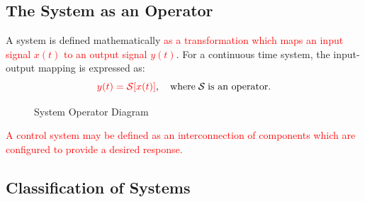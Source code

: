 \documentclass[
  12pt,
  a4paper,
]{report}
\begin{document}
\subsection{The System as an Operator}\label{the-system-as-an-operator}

\begin{tcolorbox}[colback=boxbodycol,colframe=boxheadcol,title=\textcolor{red}{\textbf{The System Operator}}]    
    A system is defined mathematically \textcolor{red}{as a transformation which maps an input signal \(x(t)\) to an output signal \(y(t)\)}. For a continuous time system, the input-output mapping is expressed as:
    \begin{equation}
        \label{eq:system-operator-def-equation}
        \textcolor{red}{y(t) = \mathcal{S}[x(t)]}, \quad \text{where} \; \mathcal{S} \; \text{is an operator.}
    \end{equation}
    \begin{tcolorbox}[colback=boxbodycol,colframe=boxheadcol,title=\textcolor{red}{\textbf{System Operator Diagram}}]
        \begin{figure}[H]
        \label{fig:system-operator-diagram-tikz}
            \begin{center}
            \end{center}
            \caption{System Operator Diagram}
        \end{figure}
    \end{tcolorbox}
    \textcolor{red}{%
            A control system may be defined as an interconnection of components which are configured to provide a desired response.}
\end{tcolorbox}

\subsection{Classification of Systems}\label{classification-of-systems}
\end{document}

